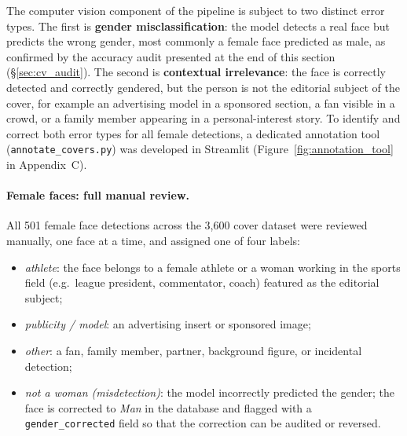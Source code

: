 \documentclass[11pt,a4paper]{article}
\begin{document}
The computer vision component of the pipeline is subject to two distinct error types. The first is \textbf{gender misclassification}: the model detects a real face but predicts the wrong gender, most commonly a female face predicted as male, as confirmed by the accuracy audit presented at the end of this section (§\ref{sec:cv_audit}). The second is \textbf{contextual irrelevance}: the face is correctly detected and correctly gendered, but the person is not the editorial subject of the cover, for example an advertising model in a sponsored section, a fan visible in a crowd, or a family member appearing in a personal-interest story. To identify and correct both error types for all female detections, a dedicated annotation tool (\texttt{annotate\_covers.py}) was developed in Streamlit (Figure~\ref{fig:annotation_tool} in Appendix~C).

\paragraph{Female faces: full manual review.}
All 501 female face detections across the 3{,}600 cover dataset were reviewed manually, one face at a time, and assigned one of four labels:

\begin{itemize}[itemsep=1pt]
  \item \textit{athlete}: the face belongs to a female athlete or a woman working in the sports field (e.g.\ league president, commentator, coach) featured as the editorial subject;
  \item \textit{publicity / model}: an advertising insert or sponsored image;
  \item \textit{other}: a fan, family member, partner, background figure, or incidental detection;
  \item \textit{not a woman (misdetection)}: the model incorrectly predicted the gender; the face is corrected to \textit{Man} in the database and flagged with a \texttt{gender\_corrected} field so that the correction can be audited or reversed.
\end{itemize}
\end{document}

